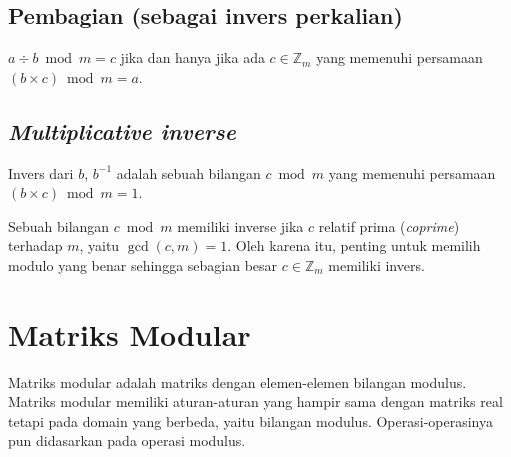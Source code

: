 \subsection{Pembagian (sebagai invers perkalian)}
$a\div b\bmod m=c$ jika dan hanya jika ada $c\in \mathbb{Z}_m$ yang memenuhi persamaan 
$(b\times c)\bmod m=a$.

\subsection{\textit{Multiplicative inverse}}
Invers dari $b$, $b^{-1}$ adalah sebuah bilangan $c\bmod m$ yang memenuhi 
persamaan $(b\times c)\bmod m=1$.\par
Sebuah bilangan $c\bmod m$ memiliki inverse jika $c$ relatif prima (\textit{coprime})
terhadap $m$, yaitu $\operatorname{gcd}(c,m)=1$. Oleh karena itu, penting untuk memilih 
modulo yang benar sehingga sebagian besar $c\in\mathbb{Z}_m$ memiliki invers.

\section{Matriks Modular}
Matriks modular adalah matriks dengan elemen-elemen bilangan modulus.
Matriks modular memiliki aturan-aturan yang hampir sama dengan matriks real
tetapi pada domain yang berbeda, yaitu bilangan modulus. Operasi-operasinya
pun didasarkan pada operasi modulus.
\newpage